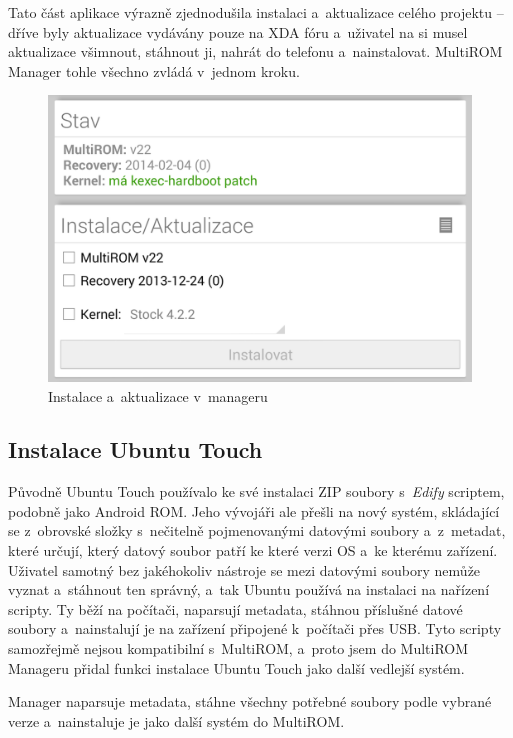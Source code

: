 \documentclass[12pt, a4paper, oneside]{article}
\newcommand{\It}{\textit}  %
\begin{document}
Tato část aplikace výrazně zjednodušila instalaci a~aktualizace celého projektu -- dříve byly aktualizace vydávány pouze na XDA fóru a~uživatel na si musel aktualizace všimnout, stáhnout ji, nahrát do telefonu a~nainstalovat. MultiROM Manager tohle všechno zvládá v~jednom kroku.

\begin{figure}[H]
\begin{center}
 \includegraphics[width=\textwidth]{img/mgr_install.png}
\caption{Instalace a~aktualizace v~manageru}
\end{center}
\end{figure}

\subsection{Instalace Ubuntu Touch}
Původně Ubuntu Touch používalo ke své instalaci ZIP soubory s~\It{Edify} scriptem, podobně jako Android ROM. Jeho vývojáři ale přešli na nový systém, skládající se z~obrovské složky s~nečitelně pojmenovanými datovými soubory a~z~metadat, které určují, který datový soubor patří ke které verzi OS a~ke kterému zařízení. Uživatel samotný bez jakéhokoliv nástroje se mezi datovými soubory nemůže vyznat a~stáhnout ten správný, a~tak Ubuntu používá na instalaci na nařízení scripty. Ty běží na počítači, naparsují metadata, stáhnou příslušné datové soubory a~nainstalují je na zařízení připojené k~počítači přes USB. Tyto scripty samozřejmě nejsou kompatibilní s~MultiROM, a~proto jsem do MultiROM Manageru přidal funkci instalace Ubuntu Touch jako další vedlejší systém.

Manager naparsuje metadata, stáhne všechny potřebné soubory podle vybrané verze a~nainstaluje je jako další systém do MultiROM.
\end{document}
